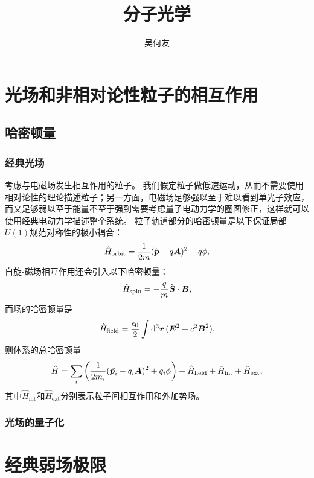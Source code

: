 \documentclass[UTF8, a4paper]{ctexart}
\title{分子光学}
\author{吴何友}
\begin{document}
\maketitle

\section{光场和非相对论性粒子的相互作用}

\subsection{哈密顿量}

\subsubsection{经典光场}

考虑与电磁场发生相互作用的粒子。
我们假定粒子做低速运动，从而不需要使用相对论性的理论描述粒子；另一方面，电磁场足够强以至于难以看到单光子效应，而又足够弱以至于能量不至于强到需要考虑量子电动力学的圈图修正，这样就可以使用经典电动力学描述整个系统。
粒子轨道部分的哈密顿量是以下保证局部$U(1)$规范对称性的极小耦合：
\begin{equation}
    \hat{H}_\text{orbit} = \frac{1}{2m} (\hat{\vb*{p}} - q \vb*{A})^2 + q \phi,
\end{equation}
自旋-磁场相互作用还会引入以下哈密顿量：
\begin{equation}
    \hat{H}_\text{spin} = - \frac{q}{m} \hat{\vb*{S}} \cdot \vb*{B},
\end{equation}
而场的哈密顿量是
\begin{equation}
    \hat{H}_\text{field} = \frac{\epsilon_0}{2} \int \dd[3]{\vb*{r}} (\vb*{E}^2 + c^2 \vb*{B}^2),
\end{equation}
则体系的总哈密顿量
\begin{equation}
    \hat{H} = \sum_i \left( \frac{1}{2m_i} (\hat{\vb*{p}_i} - q_i \vb*{A})^2 + q_i \phi \right) + \hat{H}_\text{field} + \hat{H}_\text{int} + \hat{H}_\text{ext},
\end{equation}
其中$\hat{H}_\text{int}$和$\hat{H}_\text{ext}$分别表示粒子间相互作用和外加势场。

\subsubsection{光场的量子化}

\section{经典弱场极限}
\end{document}
